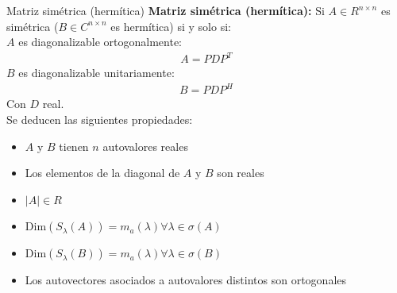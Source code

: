 \documentclass[a4paper, twoside]{article}
\numberwithin{equation}{section}
\numberwithin{figure}{section}
\numberwithin{table}{section}
\newcommand{\dime}[1]{\text{Dim}(#1)}
\newcommand{\dete}[1]{\left\vert #1 \right\vert}
\begin{document}
\begin{definicion*}{Matriz simétrica (hermítica)}
	\textbf{Matriz simétrica (hermítica):} Si $A \in R^{n \times n}$ es simétrica ($B \in C^{n \times n}$ es hermítica) si y solo si:\\
	$A$ es diagonalizable ortogonalmente:
		\begin{align}
			A=PDP^T
		\end{align}
	$B$ es diagonalizable unitariamente:
		\begin{align}
			B=PDP^H
		\end{align}
	Con $D$ real.\\
	
	Se deducen las siguientes propiedades:
	\begin{itemize}
		\item $A$ y $B$ tienen $n$ autovalores reales
		\item Los elementos de la diagonal de $A$ y $B$ son reales
		\item $\dete{A} \in R$
		\item $\dime{S_\lambda(A)}=m_a(\lambda) \forall \lambda \in \sigma(A)$
		\item $\dime{S_\lambda(B)}=m_a(\lambda) \forall \lambda \in \sigma(B)$
		\item Los autovectores asociados a autovalores distintos son ortogonales
	\end{itemize}
\end{definicion*}
\end{document}
